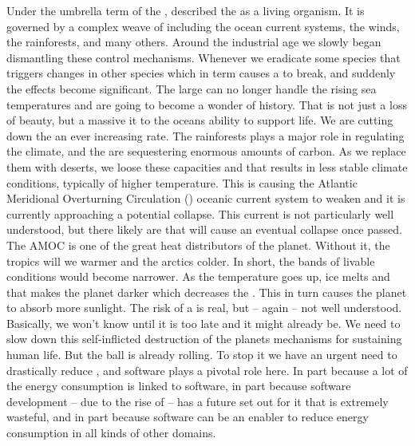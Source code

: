 Under the umbrella term of the ,  described the  as a living organism\cite{LOVELOCK1972579}. It is governed by a complex weave of  including the ocean current systems, the winds, the rainforests, and many others. Around the industrial age we slowly began dismantling these control mechanisms. Whenever we eradicate some species that triggers changes in other species which in term causes a  to break, and suddenly the effects become significant. The large  can no longer handle the rising sea temperatures and are going to become a wonder of history. That is not just a loss of beauty, but a massive it to the oceans ability to support life. We are cutting down the  an ever increasing rate. The rainforests plays a major role in regulating the climate, and the are sequestering enormous amounts of carbon. As we replace them with deserts, we loose these capacities and that results in less stable climate conditions, typically of higher temperature. This  is causing the Atlantic Meridional Overturning Circulation () oceanic current system to weaken and it is currently approaching a potential collapse. This current is not particularly well understood, but there likely are  that will cause an eventual collapse once passed. The AMOC is one of the great heat distributors of the planet. Without it, the tropics will we warmer and the arctics colder. In short, the bands of livable conditions would become narrower. As the temperature goes up, ice melts and that makes the planet darker which decreases the . This in turn causes the planet to absorb more sunlight. The risk of a  is real, but -- again -- not well understood. Basically, we won't know until it is too late and it might already be. We need to slow down this self-inflicted destruction of the planets mechanisms for sustaining human life. But the ball is already rolling. To stop it we have an urgent need to drastically reduce , and software plays a pivotal role here. In part because a lot of the energy consumption is linked to software, in part because software development -- due to the rise of  -- has a future set out for it that is extremely wasteful, and in part because software can be an enabler to reduce energy consumption in all kinds of other domains.

